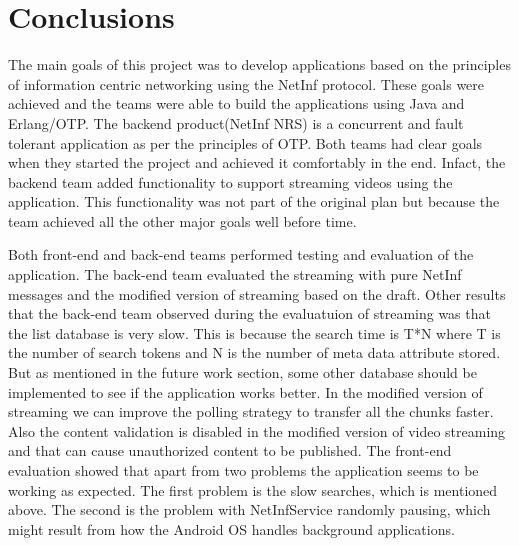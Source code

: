 \section{Conclusions}
The main goals of this project was to develop applications based on the principles of information centric networking using the NetInf protocol. These goals were achieved and the teams were able to build the applications using Java and Erlang/OTP. The backend product(NetInf NRS) is a concurrent and fault tolerant application as per the principles of OTP. Both teams had clear goals when they started the project and achieved it comfortably in the end. Infact, the backend team added functionality to support streaming videos using the application. This functionality was not part of the original plan but because the team achieved all the other major goals well before time.

Both front-end and back-end teams performed testing and evaluation of the application. The back-end team evaluated the streaming with pure NetInf messages and the modified version of streaming based on the draft. Other results that the back-end team observed during the evaluatuion of streaming was that the list database is very slow. This is because the search time is T*N where T is the number of search tokens and N is the number of meta data attribute stored. But as mentioned in the future work section, some other database should be implemented to see if the application works better. In the modified version of streaming we can improve the polling strategy to transfer all the chunks faster. Also the content validation is disabled in the modified version of video streaming and that can cause unauthorized content to be published. The front-end evaluation showed that apart from two problems the application seems to be working as expected. The first problem is the slow searches, which is mentioned above. The second is the problem with NetInfService randomly pausing, which might result from how the Android OS handles background applications.

 
